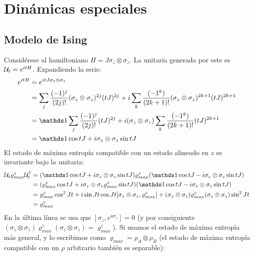 \section{Dinámicas especiales}

\subsection{Modelo de Ising}
Considérese al hamiltoniano $H=J\sigma_{z}\otimes\sigma_{z}$. La unitaria generada por este es $\mathcal{U}_{t}=e^{itH}$. Expandiendo la serie:
\begin{align*}
    e^{itH}&=e^{itJ\sigma_{z}\otimes\sigma_{z}}\\
    &=\sum_{j}\frac{(-1)^{j}}{(2j)!}(\sigma_{z}\otimes\sigma_{z})^{2j}(tJ)^{2j}+i\sum_{k}\frac{(-1^{k})}{(2k+1)!}(\sigma_{z}\otimes\sigma_{z})^{2k+1}(tJ)^{2k+1}\\
    &=\Id\sum_{j}\frac{(-1)^{j}}{(2j)!}(tJ)^{2j}+i(\sigma_{z}\otimes\sigma_{z})\sum_{k}\frac{(-1^{k})}{(2k+1)!}(tJ)^{2k+1}\\
    &=\Id \cos{tJ} + i\sigma_{z}\otimes\sigma_{z}\sin{tJ}
\end{align*}
El estado de máxima entropía compatible con un estado alineado en $z$ es invariante bajo la unitaria:
\begin{align*}
    \mcU_{t}\varrho_{max}^{z}\mcU_{t}^{\dag}&=(\Id \cos{tJ} + i\sigma_{z}\otimes\sigma_{z}\sin{tJ})\varrho_{max}^{z}(\Id \cos{tJ} - i\sigma_{z}\otimes\sigma_{z}\sin{tJ})\\
    &=(\varrho_{max}^{z} \cos{tJ} + i\sigma_{z}\otimes\sigma_{z}\varrho_{max}^{z}\sin{tJ})(\Id \cos{tJ} - i\sigma_{z}\otimes\sigma_{z}\sin{tJ})\\
    &=\varrho_{max}^{z} \cos^{2}{Jt}+i\sin{Jt}\cos{Jt}[\sigma_{z}\otimes\sigma_{z},\varrho_{max}^{z}]+(\sigma_{z}\otimes\sigma_{z}) \varrho_{max}^{z} (\sigma_{z}\otimes\sigma_{z}) \sin^{2}{Jt}\\
    &=\varrho_{max}^{z}
\end{align*}
En la última línea se usa que $[\sigma_{z},e^{a\sigma_{z}}]=0$ (y por consiguiente $(\sigma_{z}\otimes\sigma_{z}) \varrho_{max}^{z} (\sigma_{z}\otimes\sigma_{z})=\varrho_{max}^{z}$). Si usamos el estado de máxima entropía más general, y lo escribimos como $\varrho_{max}=\rho_{A}\otimes\rho_{B}$ (el estado de máxima entropía compatible con un $\rho$ arbitrario también es separable):
